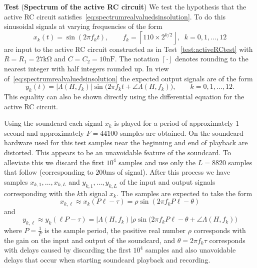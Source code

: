 \documentclass[11pt,a4paper]{book}
\theoremstyle{plain}
\numberwithin{equation}{section}
\newcommand{\abs}[1]{\left\vert #1 \right\vert}
\newcommand{\round}[1]{{\left\lceil #1 \right\rfloor}}
\newcounter{test}
\newenvironment{test}{
\begin{shaded}\refstepcounter{test}\par\noindent%
\textbf{Test \thetest}
}{
\end{shaded}
}
\begin{document}
\begin{test}\label{test:activeRCspectrumtest}
(\textbf{Spectrum of the active RC circuit})
We test the hypothesis that the active RC circuit satisfies~\eqref{eq:spectrumrealvaluedsinsolution}.  To do this sinusoidal signals at varying frequencies of the form
\[
x_k(t) = \sin( 2 \pi f_k t ), \qquad f_k = \round{110 \times 2^{k/2}}, \;\; k = 0,1,\dots,12
\]
are input to the active RC circuit constructed as in Test~\ref{test:activeRCtest} with $R = R_1 = 27\si{\kilo\ohm}$ and $C=C_2=10\si{\nano\farad}$.  The notation $\round{\cdot}$ denotes rounding to the nearest integer with half integers rounded up.  In view of~\eqref{eq:spectrumrealvaluedsinsolution} the expected output signals are of the form
\[
y_k(t) =  \abs{\Lambda(H,f_k)}\sin\big( 2 \pi f_k  t + \angle \Lambda(H,f_k)\big), \qquad k = 0,1,\dots,12.
\]
This equality can also be shown directly using the differential equation for the active RC circuit. 

Using the soundcard each signal $x_k$ is played for a period of approximately 1 second and approximately $F = 44100$ samples are obtained. On the soundcard hardware used for this test samples near the beginning and end of playback are distorted.  This appears to be an unavoidable feature of the soundcard.  To alleviate this we discard the first $10^4$ samples and use only the $L=8820$ samples that follow (corresponding to $200\si{\milli\second}$ of signal).  After this process we have samples $x_{k,1},\dots,x_{k,L}$ and $y_{k,1},\dots,y_{k,L}$ of the input and output signals corresponding with the $k$th signal $x_k$.  The samples are expected to take the form
\[
x_{k,\ell} \approx x_k(P \ell - \tau) = \rho \sin( 2 \pi f_k P \ell - \theta) 
\]
and
\[
y_{k,\ell} \approx y_k(\ell P - \tau) =  \abs{\Lambda(H,f_k)} \rho \sin\big( 2 \pi f_k P\ell - \theta  + \angle \Lambda(H,f_k) \big)
\]
where $P = \frac{1}{F}$  is the sample period, the positive real number $\rho$ corresponds with the gain on the input and output of the soundcard, and $\theta = 2\pi f_k \tau$ corresponds with delays caused by discarding the first $10^4$ samples and also unavoidable delays that occur when starting soundcard playback and recording.


\end{test}
\end{document}
